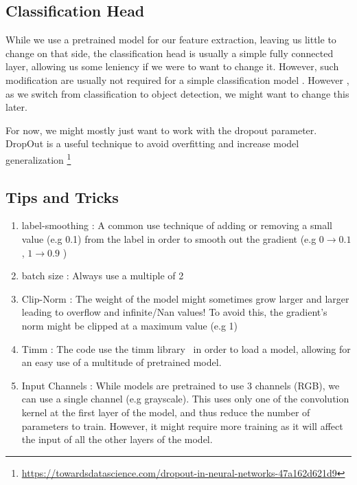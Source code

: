 \documentclass[11pt]{article}
\begin{document}
    \subsection{Classification Head}

        While we use a pretrained model for our feature extraction, leaving us little to change on that side, the classification head is usually a simple fully connected
        layer, allowing us some leniency if we were to want to change it. However, such modification are usually not required for a simple classification model . However , as we switch
        from  classification to object detection, we might want to change this later.

        For now, we might mostly just want to work with the dropout parameter. DropOut is a useful technique to avoid overfitting and increase model
        generalization \footnote{\url{https://towardsdatascience.com/dropout-in-neural-networks-47a162d621d9}}

    \subsection{Tips and Tricks}

    \begin{enumerate}
        \item label-smoothing : A common use technique of adding or removing a small value (e.g 0.1) from the label in
        order to smooth out the gradient (e.g $0\xrightarrow{}0.1$ , $1\xrightarrow{}0.9$ )

        \item batch size : Always use a multiple of 2

        \item Clip-Norm : The weight of the model might sometimes grow larger and larger leading to overflow and
        infinite/Nan values! To avoid this, the gradient's norm might be clipped at a maximum value (e.g 1)

        \item Timm : The code use the timm library~\cite{timm} in order to load a model, allowing
        for an easy use of a multitude of pretrained model.

        \item Input Channels : While models are pretrained to use 3 channels (RGB), we can use a single channel (e.g grayscale). This uses
        only one of the convolution kernel at the first layer of the model, and thus reduce the number of parameters to train. However, it might require more training
        as it will affect the input of all the other layers of the model.

    \end{enumerate}
\end{document}

